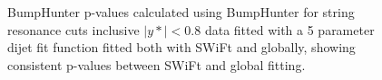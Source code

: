 \begin{figure}[!htb]
  \centering
  \caption{BumpHunter p-values calculated using BumpHunter for string resonance cuts inclusive $|y*|<0.8$ data fitted with a 5 parameter dijet fit function fitted both with SWiFt and globally, showing consistent p-values between SWiFt and global fitting.}
  \label{fig:ystar0.8FullRunBHPvalue}
\end{figure}



